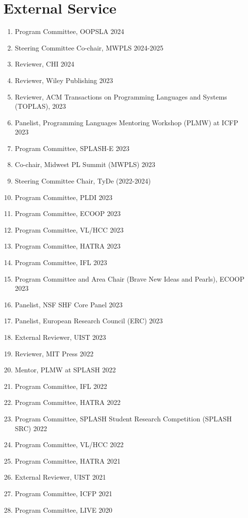 \documentclass[10pt,letterpaper]{article}
\begin{document}
\section*{External Service}
\begin{enumerate}
  \item Program Committee, OOPSLA 2024
  \item Steering Committee Co-chair, MWPLS 2024-2025
  \item Reviewer, CHI 2024
  \item Reviewer, Wiley Publishing 2023
  \item Reviewer, ACM Transactions on Programming Languages and Systems (TOPLAS), 2023
  \item Panelist, Programming Languages Mentoring Workshop (PLMW) at ICFP 2023
  \item Program Committee, SPLASH-E 2023
  \item Co-chair, Midwest PL Summit (MWPLS) 2023
  \item Steering Committee Chair, TyDe (2022-2024)
  \item Program Committee, PLDI 2023
  \item Program Committee, ECOOP 2023
  \item Program Committee, VL/HCC 2023
  \item Program Committee, HATRA 2023
  \item Program Committee, IFL 2023
  \item Program Committee and Area Chair (Brave New Ideas and Pearls), ECOOP 2023
  \item Panelist, NSF SHF Core Panel 2023
  \item Panelist, European Research Council (ERC) 2023
  \item External Reviewer, UIST 2023
  \item Reviewer, MIT Press 2022
  \item Mentor, PLMW at SPLASH 2022
  \item Program Committee, IFL 2022
  \item Program Committee, HATRA 2022
  \item Program Committee, SPLASH Student Research Competition (SPLASH SRC) 2022
  \item Program Committee, VL/HCC 2022
  \item Program Committee, HATRA 2021
  \item External Reviewer, UIST 2021
  \item Program Committee, ICFP 2021
  \item Program Committee, LIVE 2020

\end{enumerate}
\end{document}
